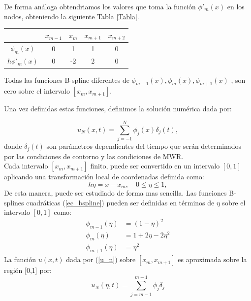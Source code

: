De forma análoga obtendriamos los valores que toma la función $\phi'_{m}(x)$  en los nodos, obteniendo la siguiente Tabla \ref{Tabla}.\\

\begin{table}[h]
\begin{center}
 \begin{tabular}{| c | c | c | c | c |} 
 \hline
    & $x_{m-1}$ & $x_{m}$  & $x_{m+1}$ & $x_{m+2}$ \\ \hline
  $\phi_{m}(x)$ & 0 & 1 & 1 & 0 \\
  $h\phi'_{m}(x)$ & 0 & -2 & 2 & 0 \\ \hline
 \hline
 \end{tabular}
 \end{center}
\end{table}\label{Tabla}

Todas las funciones B-spline diferentes de $\phi_{m-1}(x) , \phi_{m}(x) , \phi_{m+1}(x)$ , son cero sobre el intervalo $[x_{m},x_{m+1}]$.

Una vez definidas estas funciones, definimos la solución numérica dada por:

\begin{equation}
\label{u_n}
    u_{N}(x,t)=\sum_{j=-1}^{N}\phi_{j}(x)\delta_{j}(t),
\end{equation}
 donde $\delta_{j}(t)$ son parámetros dependientes del tiempo que serán determinados por las condiciones de contorno y las condiciones de MWR.\\
 
 Cada intervalo $[x_{m},x_{m+1}]$ finito, puede ser convertido en un intervalo $[0,1]$ aplicando una transformación local de coordenadas definida como:
 \begin{equation}
 \label{CambioVariable}
     h\eta=x-x_{m}, \quad 0\leq \eta \leq 1,
 \end{equation}
De esta manera, puede ser estudiado de forma mas sencilla. Las funciones B-splines cuadráticas (\ref{ec_bspline}) pueden ser definidas en términos de $\eta$ sobre el intervalo $[0,1]$ como:
\begin{equation}\label{CVariablephi}
    \begin{split}
        \phi_{m-1}(\eta) &=(1-\eta)^{2}\\
    \phi_{m}(\eta) &=1+2\eta-2\eta^{2}\\
    \phi_{m+1}(\eta) &=\eta^{2}
    \end{split}
\end{equation}
 La función $u(x,t)$ dada por (\ref{u_n}) sobre $[x_{m},x_{m+1}]$ es aproximada  sobre la región [0,1] por:
$$u_{N}(\eta,t)=\sum_{j=m-1}^{m+1}\phi_{j}\delta_{j}$$ 


